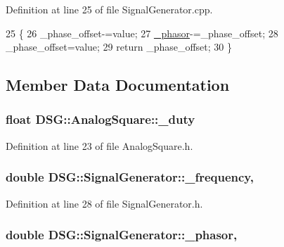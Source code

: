 Definition at line 25 of file Signal\+Generator.\+cpp.


\begin{DoxyCode}
25                                                                 \{
26     \_phase\_offset-=value;
27     \hyperlink{classDSG_1_1SignalGenerator_ac2271b582bf699275f077ecb642a8cd9}{\_phasor}-=\_phase\_offset;
28     \_phase\_offset=value;
29     \textcolor{keywordflow}{return} \_phase\_offset;
30 \}\end{DoxyCode}


\subsection{Member Data Documentation}
\hypertarget{classDSG_1_1AnalogSquare_a11b3c60fa31d10264f564aff5f69c4ef}{
\subsubsection[{\+\_\+duty}]{\setlength{\rightskip}{0pt plus 5cm}float D\+S\+G\+::\+Analog\+Square\+::\+\_\+duty\hspace{0.3cm}{\ttfamily [protected]}}}\label{classDSG_1_1AnalogSquare_a11b3c60fa31d10264f564aff5f69c4ef}


Definition at line 23 of file Analog\+Square.\+h.

\hypertarget{classDSG_1_1SignalGenerator_a67e296e3506dcdf09402c667cddff9ac}{
\subsubsection[{\+\_\+frequency}]{\setlength{\rightskip}{0pt plus 5cm}double D\+S\+G\+::\+Signal\+Generator\+::\+\_\+frequency\hspace{0.3cm}{\ttfamily [protected]}, {\ttfamily [inherited]}}}\label{classDSG_1_1SignalGenerator_a67e296e3506dcdf09402c667cddff9ac}


Definition at line 28 of file Signal\+Generator.\+h.

\hypertarget{classDSG_1_1SignalGenerator_ac2271b582bf699275f077ecb642a8cd9}{
\subsubsection[{\+\_\+phasor}]{\setlength{\rightskip}{0pt plus 5cm}double D\+S\+G\+::\+Signal\+Generator\+::\+\_\+phasor\hspace{0.3cm}{\ttfamily [protected]}, {\ttfamily [inherited]}}}\label{classDSG_1_1SignalGenerator_ac2271b582bf699275f077ecb642a8cd9}



